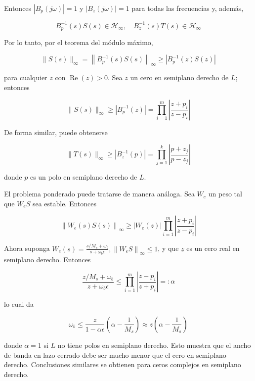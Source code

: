 Entonces $\left|B_{p}(j \omega)\right|=1$ y $\left|B_{z}(j \omega)\right|=1$ para todas las frecuencias y, además,

$$
B_{p}^{-1}(s) S(s) \in \mathcal{H}_{\infty}, \quad B_{z}^{-1}(s) T(s) \in \mathcal{H}_{\infty}
$$

Por lo tanto, por el teorema del módulo máximo,

$$
\|S(s)\|_{\infty}=\left\|B_{p}^{-1}(s) S(s)\right\|_{\infty} \geq\left|B_{p}^{-1}(z) S(z)\right|
$$

para cualquier $z$ con $\operatorname{Re}(z)>0$. Sea $z$ un cero en semiplano derecho de $L$; entonces

$$
\|S(s)\|_{\infty} \geq\left|B_{p}^{-1}(z)\right|=\prod_{i=1}^{m}\left|\frac{z+p_{i}}{z-p_{i}}\right|
$$

De forma similar, puede obtenerse

$$
\|T(s)\|_{\infty} \geq\left|B_{z}^{-1}(p)\right|=\prod_{j=1}^{k}\left|\frac{p+z_{j}}{p-z_{j}}\right|
$$

donde $p$ es un polo en semiplano derecho de $L$.

El problema ponderado puede tratarse de manera análoga. Sea $W_{e}$ un peso tal que $W_{e} S$ sea estable. Entonces

$$
\left\|W_{e}(s) S(s)\right\|_{\infty} \geq\left|W_{e}(z)\right| \prod_{i=1}^{m}\left|\frac{z+p_{i}}{z-p_{i}}\right|
$$

Ahora suponga $W_{e}(s)=\frac{s / M_{s}+\omega_{b}}{s+\omega_{b} \epsilon},\left\|W_{e} S\right\|_{\infty} \leq 1$, y que $z$ es un cero real en semiplano derecho. Entonces

$$
\frac{z / M_{s}+\omega_{b}}{z+\omega_{b} \epsilon} \leq \prod_{i=1}^{m}\left|\frac{z-p_{i}}{z+p_{i}}\right|=: \alpha
$$

lo cual da

$$
\omega_{b} \leq \frac{z}{1-\alpha \epsilon}\left(\alpha-\frac{1}{M_{s}}\right) \approx z\left(\alpha-\frac{1}{M_{s}}\right)
$$

donde $\alpha=1$ si $L$ no tiene polos en semiplano derecho. Esto muestra que el ancho de banda en lazo cerrado debe ser mucho menor que el cero en semiplano derecho. Conclusiones similares se obtienen para ceros complejos en semiplano derecho.

